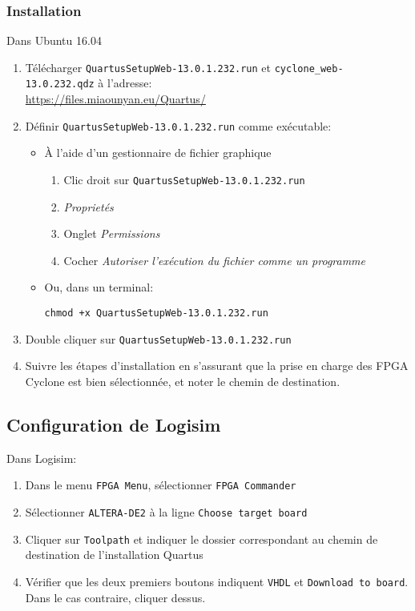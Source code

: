 \subsubsection{Installation}
\noindent Dans Ubuntu 16.04
\begin{enumerate}
	\item Télécharger \texttt{QuartusSetupWeb-13.0.1.232.run} et \texttt{cyclone\_web-13.0.232.qdz} à l'adresse: \\
	\url{https://files.miaounyan.eu/Quartus/}
	\item Définir \texttt{QuartusSetupWeb-13.0.1.232.run} comme exécutable:
		\begin{itemize}
			\item À l'aide d'un gestionnaire de fichier graphique
			\begin{enumerate}
				\item Clic droit sur \texttt{QuartusSetupWeb-13.0.1.232.run}
				\item \textit{Proprietés}
				\item Onglet \textit{Permissions}
				\item Cocher \textit{Autoriser l'exécution du fichier comme un programme}
			\end{enumerate}
\vspace{0.2em}
			\item Ou, dans un terminal:
			\begin{lstlisting}
chmod +x QuartusSetupWeb-13.0.1.232.run
			\end{lstlisting}
		\end{itemize}
	\item Double cliquer sur \texttt{QuartusSetupWeb-13.0.1.232.run}
	\item Suivre les étapes d'installation en s'assurant que la prise en charge des FPGA Cyclone est bien sélectionnée, et noter le chemin de destination.
\end{enumerate}

\subsection{Configuration de Logisim}
\noindent Dans Logisim:
\begin{enumerate}
	\item Dans le menu \texttt{FPGA Menu}, sélectionner \texttt{FPGA Commander}
	\item Sélectionner \texttt{ALTERA-DE2} à la ligne \texttt{Choose target board}
	\item Cliquer sur \texttt{Toolpath} et indiquer le dossier correspondant au chemin de destination de l'installation Quartus
	\item Vérifier que les deux premiers boutons indiquent \texttt{VHDL} et \texttt{Download to board}. Dans le cas contraire, cliquer dessus.
\end{enumerate}

